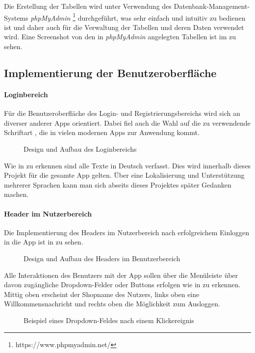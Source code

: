 Die Erstellung der Tabellen wird unter Verwendung des Datenbank-Management-Systems \textit{phpMyAdmin} \footnote{https://www.phpmyadmin.net/} durchgeführt, was sehr einfach und intuitiv zu bedienen ist und daher auch für die Verwaltung der Tabellen und deren Daten verwendet wird. Eine Screenshot von den in \textit{phpMyAdmin} angelegten Tabellen ist im  zu sehen.

\subsection{Implementierung der Benutzeroberfläche}
\label{sec:ImplementierungBenutzeroberflaeche}

\paragraph{Loginbereich} Für die Benutzeroberfläche des Login- und Registrierungsbereichs wird sich an diverser anderer Apps orientiert. Dabei fiel auch die Wahl auf die zu verwendende Schriftart , die in vielen modernen Apps zur Anwendung kommt.
\begin{figure}[htb]
\centering
{}
\caption{Design und Aufbau des Loginbereichs}
\label{fig:loginbereich}
\end{figure} 
Wie in  zu erkennen sind alle Texte in Deutsch verfasst. Dies wird innerhalb dieses Projekt für die gesamte App gelten. Über eine Lokalisierung und Unterstützung mehrerer Sprachen kann man sich abseits dieses Projektes später Gedanken machen.
\newpage
\paragraph{Header im Nutzerbereich}
Die Implementierung des Headers im Nutzerbereich nach erfolgreichem Einloggen in die App ist in  zu sehen.
\begin{figure}[htb]
\centering
{}
\caption{Design und Aufbau des Headers im Benutzerbereich}
\label{fig:nutzerbereich}
\end{figure}
Alle Interaktionen des Benutzers mit der App sollen über die Menüleiste über davon zugängliche Dropdown-Felder oder Buttons erfolgen wie in  zu erkennen. Mittig oben erscheint der Shopname des Nutzers, links oben eine Willkommensnachricht und rechts oben die Möglichkeit zum Ausloggen.
 \begin{figure}[htb]
\centering
{}
\caption{Beispiel eines Dropdown-Feldes nach einem Klickereignis}
\label{fig:dropdown}
\end{figure}
